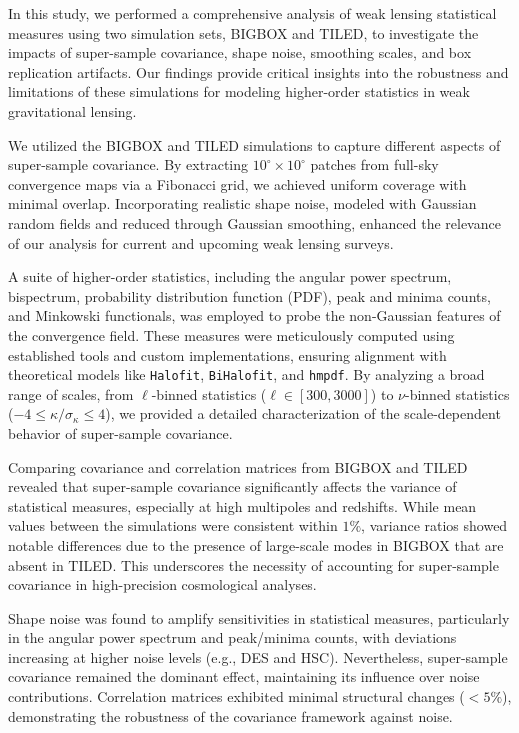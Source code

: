 In this study, we performed a comprehensive analysis of weak lensing statistical measures using two simulation sets, BIGBOX and TILED, to investigate the impacts of super-sample covariance, shape noise, smoothing scales, and box replication artifacts. Our findings provide critical insights into the robustness and limitations of these simulations for modeling higher-order statistics in weak gravitational lensing.

We utilized the BIGBOX and TILED simulations to capture different aspects of super-sample covariance. By extracting $10^\circ \times 10^\circ$ patches from full-sky convergence maps via a Fibonacci grid, we achieved uniform coverage with minimal overlap. Incorporating realistic shape noise, modeled with Gaussian random fields and reduced through Gaussian smoothing, enhanced the relevance of our analysis for current and upcoming weak lensing surveys.

A suite of higher-order statistics, including the angular power spectrum, bispectrum, probability distribution function (PDF), peak and minima counts, and Minkowski functionals, was employed to probe the non-Gaussian features of the convergence field. These measures were meticulously computed using established tools and custom implementations, ensuring alignment with theoretical models like \texttt{Halofit}, \texttt{BiHalofit}, and \texttt{hmpdf}. By analyzing a broad range of scales, from $\ell$-binned statistics ($\ell \in [300,3000]$) to $\nu$-binned statistics ($-4 \leq \kappa/\sigma_\kappa \leq 4$), we provided a detailed characterization of the scale-dependent behavior of super-sample covariance.

Comparing covariance and correlation matrices from BIGBOX and TILED revealed that super-sample covariance significantly affects the variance of statistical measures, especially at high multipoles and redshifts. While mean values between the simulations were consistent within $1\%$, variance ratios showed notable differences due to the presence of large-scale modes in BIGBOX that are absent in TILED. This underscores the necessity of accounting for super-sample covariance in high-precision cosmological analyses.

Shape noise was found to amplify sensitivities in statistical measures, particularly in the angular power spectrum and peak/minima counts, with deviations increasing at higher noise levels (e.g., DES and HSC). Nevertheless, super-sample covariance remained the dominant effect, maintaining its influence over noise contributions. Correlation matrices exhibited minimal structural changes ($<5\%$), demonstrating the robustness of the covariance framework against noise.

